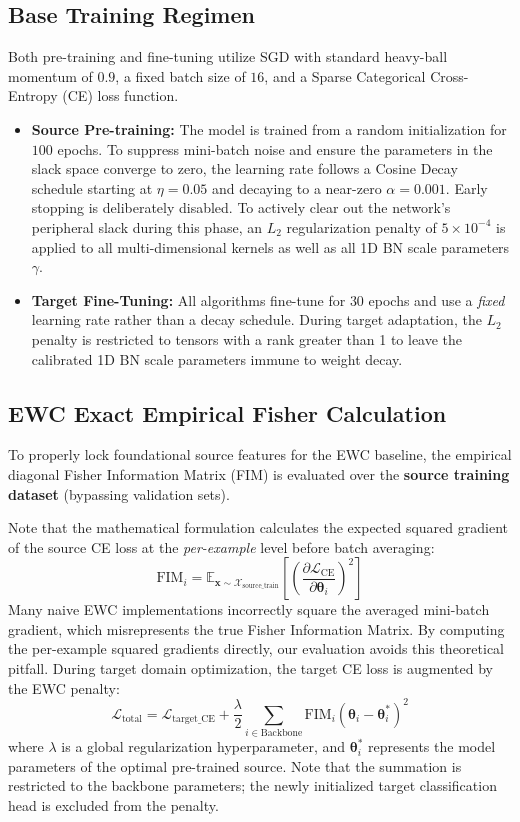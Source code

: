 \documentclass[11pt, a4paper, copyright, gdm]{google}
\newcommand{\xVect}{\boldsymbol{x}}
\newcommand{\thetaVect}{\boldsymbol{\theta}}
\newcommand{\calL}{\mathcal{L}}
\newcommand{\calX}{\mathcal{X}}
\newcommand{\E}{\mathbb{E}}
\theoremstyle{definition}
\begin{document}
\subsection{Base Training Regimen}
Both pre-training and fine-tuning utilize SGD with standard heavy-ball momentum of $0.9$, a fixed batch size of $16$, and a Sparse Categorical Cross-Entropy (CE) loss function. 
\begin{itemize}
    \item \textbf{Source Pre-training:} The model is trained from a random initialization for $100$ epochs. To suppress mini-batch noise and ensure the parameters in the slack space converge to zero, the learning rate follows a Cosine Decay schedule starting at $\eta = 0.05$ and decaying to a near-zero $\alpha = 0.001$. Early stopping is deliberately disabled. To actively clear out the network's peripheral slack during this phase, an $L_2$ regularization penalty of $5 \times 10^{-4}$ is applied to all multi-dimensional kernels as well as all 1D BN scale parameters $\gamma$.
    \item \textbf{Target Fine-Tuning:} All algorithms fine-tune for $30$ epochs and use a \textit{fixed} learning rate rather than a decay schedule. During target adaptation, the $L_2$ penalty is restricted to tensors with a rank greater than 1 to leave the calibrated 1D BN scale parameters immune to weight decay.
\end{itemize}

\subsection{EWC Exact Empirical Fisher Calculation}
To properly lock foundational source features for the EWC baseline, the empirical diagonal Fisher Information Matrix (FIM) is evaluated over the \textbf{source training dataset} (bypassing validation sets). 

Note that the mathematical formulation calculates the expected squared gradient of the source CE loss at the \textit{per-example} level before batch averaging:
\begin{equation}
    \text{FIM}_i = \E_{\xVect \sim \calX_{\text{source\_train}}} \left[ \left( \frac{\partial \calL_{\text{CE}}}{\partial \thetaVect_i} \right)^2 \right]
\end{equation}
Many naive EWC implementations incorrectly square the averaged mini-batch gradient, which misrepresents the true Fisher Information Matrix. By computing the per-example squared gradients directly, our evaluation avoids this theoretical pitfall. During target domain optimization, the target CE loss is augmented by the EWC penalty:
\begin{equation}
    \calL_{\text{total}} = \calL_{\text{target\_CE}} + \frac{\lambda}{2} \sum_{i \in \text{Backbone}} \text{FIM}_i (\thetaVect_i - \thetaVect_i^*)^2
\end{equation}
where $\lambda$ is a global regularization hyperparameter, and $\thetaVect_i^*$ represents the model parameters of the optimal pre-trained source. Note that the summation is restricted to the backbone parameters; the newly initialized target classification head is excluded from the penalty.
\end{document}
